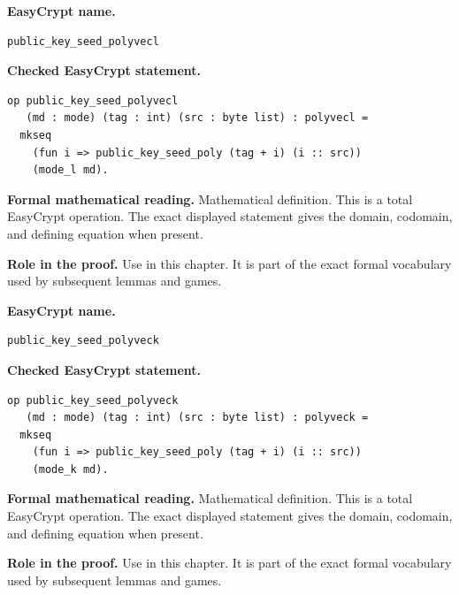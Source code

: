 \begin{formaldefinition}
\noindent\textbf{EasyCrypt name.}
\begin{lstlisting}[language=EasyCrypt,basicstyle=\ttfamily\scriptsize]
public_key_seed_polyvecl
\end{lstlisting}
\noindent\textbf{Checked EasyCrypt statement.}
\begin{lstlisting}[language=EasyCrypt,basicstyle=\ttfamily\scriptsize]
op public_key_seed_polyvecl
   (md : mode) (tag : int) (src : byte list) : polyvecl =
  mkseq
    (fun i => public_key_seed_poly (tag + i) (i :: src))
    (mode_l md).
\end{lstlisting}
\noindent\textbf{Formal mathematical reading.}
Mathematical definition. This is a total EasyCrypt operation.  The exact displayed statement gives the domain, codomain, and defining equation when present.

\noindent\textbf{Role in the proof.}
Use in this chapter. It is part of the exact formal vocabulary used by subsequent lemmas and games.

\end{formaldefinition}

\begin{formaldefinition}
\noindent\textbf{EasyCrypt name.}
\begin{lstlisting}[language=EasyCrypt,basicstyle=\ttfamily\scriptsize]
public_key_seed_polyveck
\end{lstlisting}
\noindent\textbf{Checked EasyCrypt statement.}
\begin{lstlisting}[language=EasyCrypt,basicstyle=\ttfamily\scriptsize]
op public_key_seed_polyveck
   (md : mode) (tag : int) (src : byte list) : polyveck =
  mkseq
    (fun i => public_key_seed_poly (tag + i) (i :: src))
    (mode_k md).
\end{lstlisting}
\noindent\textbf{Formal mathematical reading.}
Mathematical definition. This is a total EasyCrypt operation.  The exact displayed statement gives the domain, codomain, and defining equation when present.

\noindent\textbf{Role in the proof.}
Use in this chapter. It is part of the exact formal vocabulary used by subsequent lemmas and games.

\end{formaldefinition}

